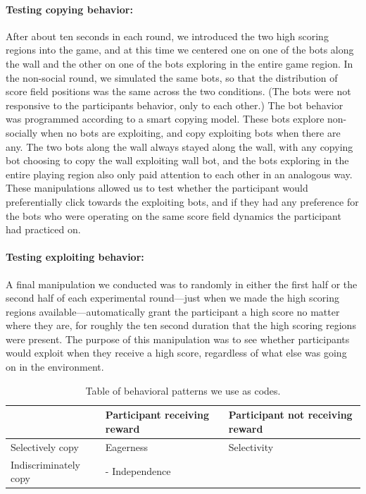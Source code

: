 \documentclass[12pt,letterpaper]{article}
\begin{document}
\paragraph{Testing copying behavior:} After about ten seconds in each round, we introduced the two high scoring regions into the game, and at this time we centered one on one of the bots along the wall and the other on one of the bots exploring in the entire game region. In the non-social round, we simulated the same bots, so that the distribution of score field positions was the same across the two conditions. (The bots were not responsive to the participants behavior, only to each other.) The bot behavior was programmed according to a smart copying model. These bots explore non-socially when no bots are exploiting, and copy exploiting bots when there are any. The two bots along the wall always stayed along the wall, with any copying bot choosing to copy the wall exploiting wall bot, and the bots exploring in the entire playing region also only paid attention to each other in an analogous way. These manipulations allowed us to test whether the participant would preferentially click towards the exploiting bots, and if they had any preference for the bots who were operating on the same score field dynamics the participant had practiced on.

\paragraph{Testing exploiting behavior:} A final manipulation we conducted was to randomly in either the first half or the second half of each experimental round---just when we made the high scoring regions available---automatically grant the participant a high score no matter where they are, for roughly the ten second duration that the high scoring regions were present. The purpose of this manipulation was to see whether participants would exploit when they receive a high score, regardless of what else was going on in the environment.

\begin{table}[]
\begin{tabular}{l|l|l}
                      & Participant receiving reward & Participant not receiving reward  \\ \hline
Selectively copy  & Eagerness                  & \multicolumn{1}{l|}{Selectivity} \\ \hline
Indiscriminately copy &  \multicolumn{2}{l|}{ - Independence}  \\ \cline{1-3} 
\end{tabular}
\caption{Table of behavioral patterns we use as codes.}
\end{table}
\end{document}
